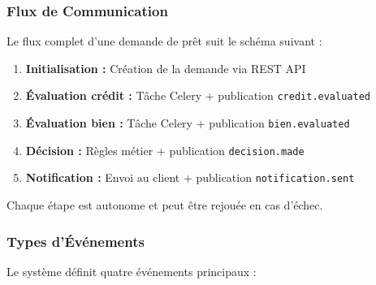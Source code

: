 \documentclass[12pt,a4paper]{article}
\begin{document}
\subsubsection{Flux de Communication}

Le flux complet d'une demande de prêt suit le schéma suivant :

\begin{enumerate}
    \item \textbf{Initialisation :} Création de la demande via REST API
    \item \textbf{Évaluation crédit :} Tâche Celery + publication \texttt{credit.evaluated}
    \item \textbf{Évaluation bien :} Tâche Celery + publication \texttt{bien.evaluated}
    \item \textbf{Décision :} Règles métier + publication \texttt{decision.made}
    \item \textbf{Notification :} Envoi au client + publication \texttt{notification.sent}
\end{enumerate}

Chaque étape est autonome et peut être rejouée en cas d'échec.

\subsubsection{Types d'Événements}

Le système définit quatre événements principaux :
\end{document}
